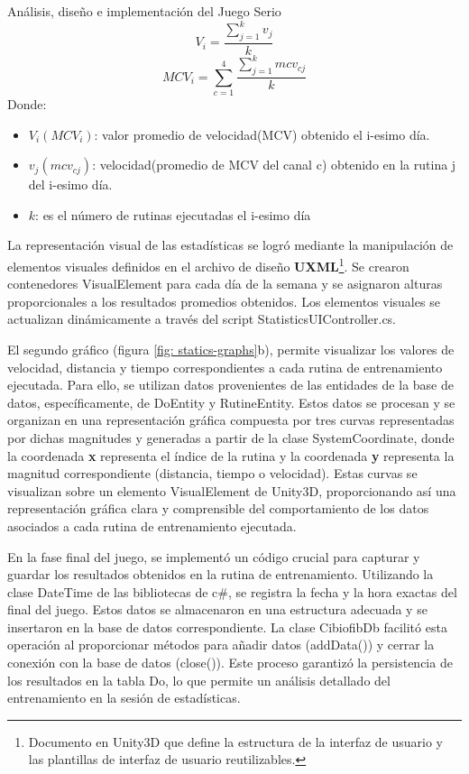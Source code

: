 \begin{thesischapter}{2} {Análisis, diseño e implementación del Juego Serio}
    \begin{equation}
    V_{i} = \frac{\sum_{j=1}^{k} v_{j}}{k}
    \label{eq: 2}
    \end{equation}
    \begin{equation}
    MCV_{i} = \sum_{c=1}^{4}\frac{\sum_{j=1}^{k} mcv_{c j}}{k}
    \label{eq: 3}
\end{equation}
Donde:
\begin{itemize}
    \item $V_{i} (MCV_{i})$: valor promedio de velocidad(MCV) obtenido el i-esimo día.
    \item $v_{j}(mcv_{cj})$: velocidad(promedio de MCV del canal c) obtenido en la rutina j del i-esimo día. 
    \item $k$: es el número de rutinas ejecutadas el i-esimo día 
\end{itemize}
La representación visual de las estadísticas se logró mediante la manipulación de elementos visuales definidos en el archivo de diseño \textbf{UXML}\footnote{Documento en Unity3D que define la estructura de la interfaz de usuario y las plantillas de interfaz de usuario reutilizables.}. Se crearon contenedores VisualElement para cada día de la semana y se asignaron alturas proporcionales a los resultados promedios obtenidos. Los 
elementos visuales se actualizan dinámicamente a través del script StatisticsUIController.cs.

El segundo gráfico (figura \ref{fig: statics-graphs}b), permite visualizar los valores de velocidad, distancia y tiempo 
correspondientes a cada rutina de entrenamiento ejecutada. Para ello, se utilizan datos provenientes de las entidades 
de la base de datos, específicamente, de DoEntity y RutineEntity. Estos datos se procesan y se organizan 
en una representación gráfica compuesta por tres curvas representadas por dichas magnitudes y generadas a partir de la clase 
SystemCoordinate, donde la coordenada \textbf{x} representa el índice de la rutina y la coordenada \textbf{y} representa la magnitud correspondiente (distancia, tiempo o velocidad). Estas curvas 
se visualizan sobre un elemento VisualElement de Unity3D, proporcionando así una representación gráfica clara y comprensible del 
comportamiento de los datos asociados a cada rutina de entrenamiento ejecutada.
    

En la fase final del juego, se implementó un código crucial para capturar y guardar los resultados obtenidos en la rutina de entrenamiento. Utilizando la clase DateTime de las bibliotecas de c\#, 
se registra la fecha y la hora exactas del final del juego. Estos datos se almacenaron en una estructura adecuada y se insertaron en la base de datos correspondiente. La clase CibiofibDb facilitó esta 
operación al proporcionar métodos para añadir datos (addData()) y cerrar la conexión con la base de datos (close()). Este proceso garantizó la persistencia de los resultados en la tabla Do, lo que 
permite un análisis detallado del entrenamiento en la sesión de estadísticas.


\end{thesischapter}
